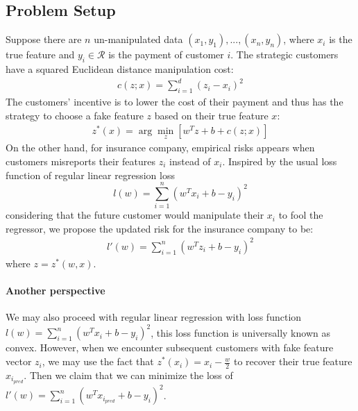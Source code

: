 \documentclass{article}
\begin{document}
\subsection{Problem Setup}
Suppose there are $n$ un-manipulated data $(x_1,y_1), ... , (x_n,y_n)$, where $x_i$ is the true feature and $y_i \in \mathcal{R} $ is the payment of customer $i$. The strategic customers have a squared Euclidean distance manipulation cost: 
\begin{align*}
    c(z;x) = \sum_{i=1}^{d}(z_i-x_i)^2 
\end{align*}
The customers' incentive is to lower the cost of their payment and thus has the strategy to choose a fake feature $z$ based on their true feature $x$:
\begin{align*}
z^* (x)= \arg\min\limits_z [w^T z + b + c(z;x)]
\end{align*}
On the other hand, for insurance company, empirical risks appears when customers misreports their features $z_i$ instead of $x_i$. Inspired by the usual loss function of regular linear regression loss \[l(w) = \sum_{i = 1}^n (w^Tx_i + b - y_i)^2\] considering that the future customer would manipulate their $x_i$ to fool the regressor, we propose the updated risk for the insurance company to be:
\begin{align*}
l'(w)=\sum_{i = 1}^n (w^Tz_i + b - y_i)^2
\end{align*} where $z = z^*(w,x)$.

\paragraph{Another perspective}
We may also proceed with regular linear regression with loss function $l(w) = \sum_{i = 1}^n (w^Tx_i + b - y_i)^2$, this loss function is universally known as convex. However, when we encounter subsequent customers with fake feature vector $z_i$, we may use the fact that $z^*(x_i) = x_i - \frac{w}{2}$ to recover their true feature $x_{i_{pred}}$. Then we claim that we can minimize the loss of $l'(w) = \sum_{i = 1}^n (w^Tx_{i_{pred}} + b - y_i)^2$.
\end{document}
